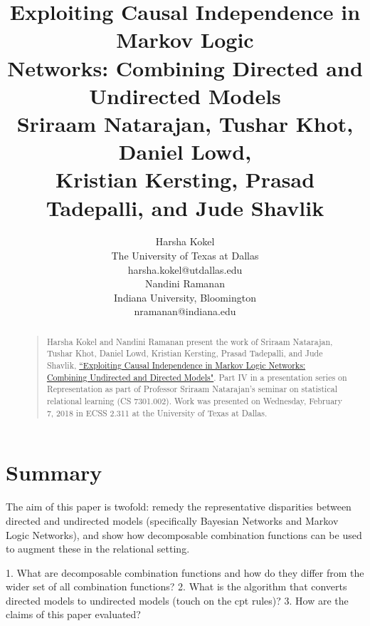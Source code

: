 \documentclass[letterpaper]{article}
\begin{document}
%
\title{Exploiting Causal Independence in Markov Logic\\Networks: Combining Directed and Undirected Models\\
\large Sriraam Natarajan, Tushar Khot, Daniel Lowd,\\Kristian Kersting, Prasad Tadepalli, and Jude Shavlik
}
\author{Harsha Kokel\\
The University of Texas at Dallas\\
harsha.kokel@utdallas.edu\\
\And
Nandini Ramanan\\
Indiana University, Bloomington\\
nramanan@indiana.edu\\
}

\maketitle
\begin{abstract}
\begin{quote}
Harsha Kokel and Nandini Ramanan present the work of Sriraam Natarajan, Tushar Khot, Daniel Lowd, Kristian Kersting, Prasad Tadepalli, and Jude Shavlik, \href{http://homes.soic.indiana.edu/natarasr/Papers/Natarajan.ECML10.pdf}{``Exploiting Causal Independence in Markov Logic Networks: Combining Undirected and Directed Models"}. Part IV in a presentation series on Representation as part of Professor Sriraam Natarajan's seminar on statistical relational learning (CS 7301.002). Work was presented on Wednesday, February 7, 2018 in ECSS 2.311 at the University of Texas at Dallas.
\end{quote}
\end{abstract}

\section{Summary}

The aim of this paper is twofold: remedy the representative disparities between directed and undirected models (specifically Bayesian Networks and Markov Logic Networks), and show how decomposable combination functions can be used to augment these in the relational setting.

1. What are decomposable combination functions and how do they differ from the wider set of all combination functions?
2. What is the algorithm that converts directed models to undirected models (touch on the cpt rules)?
3. How are the claims of this paper evaluated?
\end{document}
